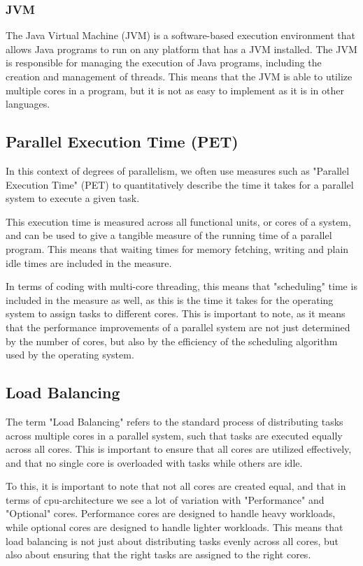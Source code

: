 \documentclass[12pt,a4paper]{article}
\begin{document}
\subsubsection{JVM}

The Java Virtual Machine (JVM) is a software-based execution environment that allows Java programs to run on any platform that has a JVM installed. The JVM is responsible for managing the execution of Java programs, including the creation and management of threads. This means that the JVM is able to utilize multiple cores in a program, but it is not as easy to implement as it is in other languages.

\subsection{Parallel Execution Time (PET)}

In this context of degrees of parallelism, we often use measures such as "Parallel Execution Time" (PET) to quantitatively describe the time it takes for a parallel system to execute a given task. 

This execution time is measured across all functional units, or cores of a system, and can be used to give a tangible measure of the running time of a parallel program. This means that waiting times for memory fetching, writing and plain idle times are included in the measure.

In terms of coding with multi-core threading, this means that "scheduling" time is included in the measure as well, as this is the time it takes for the operating system to assign tasks to different cores. This is important to note, as it means that the performance improvements of a parallel system are not just determined by the number of cores, but also by the efficiency of the scheduling algorithm used by the operating system.

\subsection{Load Balancing}

The term "Load Balancing" refers to the standard process of distributing tasks across multiple cores in a parallel system, such that tasks are executed equally across all cores. This is important to ensure that all cores are utilized effectively, and that no single core is overloaded with tasks while others are idle.

To this, it is important to note that not all cores are created equal, and that in terms of cpu-architecture we see a lot of variation with "Performance" and "Optional" cores. Performance cores are designed to handle heavy workloads, while optional cores are designed to handle lighter workloads. This means that load balancing is not just about distributing tasks evenly across all cores, but also about ensuring that the right tasks are assigned to the right cores. 
\end{document}
